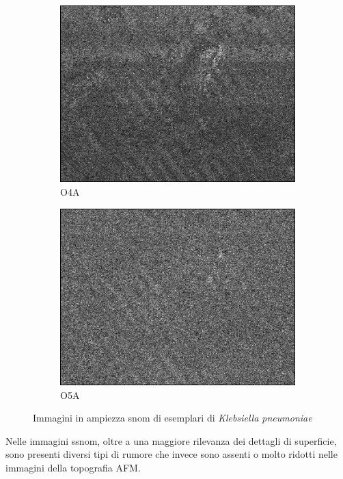\documentclass[../main.tex]{subfiles}
\begin{document}
\begin{figure}[ht]
\begin{subfigure}{0.32\linewidth}
			\includegraphics[keepaspectratio, width=\linewidth]{images/kp_o4a.png}
			\caption{O4A}
		\end{subfigure}
		\begin{subfigure}{0.32\linewidth}
			\centering
			\includegraphics[keepaspectratio, width=\linewidth]{images/kp_o5a.png}
			\caption{O5A}
		\end{subfigure}
		\caption[Immagini in ampiezza SNOM di esemplari di \textit{Klebsiella pneumoniae}]{
			Immagini in ampiezza \acrshort{snom} di esemplari di \textit{Klebsiella pneumoniae} \cite{ssnombacter_data}}
	\end{figure}
	
	Nelle immagini \acrshort{ssnom}, oltre a una maggiore rilevanza dei dettagli di superficie, sono presenti diversi tipi di rumore  che invece sono assenti o molto ridotti nelle immagini della topografia AFM.
	
\end{document}
